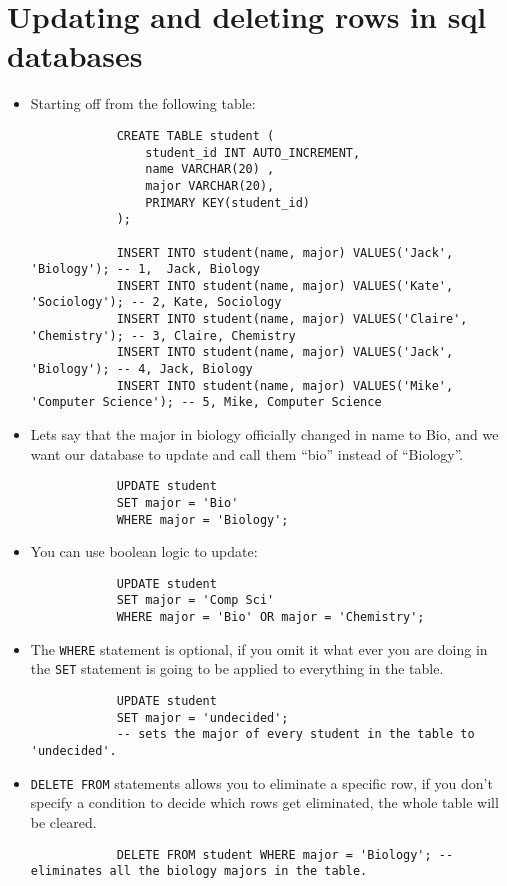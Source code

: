 \section{Updating and deleting rows in sql databases}
\begin{itemize}
    \item Starting off from the following table:
        \begin{verbatim}
            CREATE TABLE student (
                student_id INT AUTO_INCREMENT,
                name VARCHAR(20) ,
                major VARCHAR(20),
                PRIMARY KEY(student_id)
            );

            INSERT INTO student(name, major) VALUES('Jack', 'Biology'); -- 1,  Jack, Biology
            INSERT INTO student(name, major) VALUES('Kate', 'Sociology'); -- 2, Kate, Sociology
            INSERT INTO student(name, major) VALUES('Claire', 'Chemistry'); -- 3, Claire, Chemistry
            INSERT INTO student(name, major) VALUES('Jack', 'Biology'); -- 4, Jack, Biology
            INSERT INTO student(name, major) VALUES('Mike', 'Computer Science'); -- 5, Mike, Computer Science
        \end{verbatim}
    
    \item Lets say that the major in biology officially changed in name to Bio, and we want our database to update and call them ``bio'' instead of ``Biology''.
        \begin{verbatim}
            UPDATE student 
            SET major = 'Bio'
            WHERE major = 'Biology';
        \end{verbatim}
    
    \item You can use boolean logic to update:
        \begin{verbatim}
            UPDATE student 
            SET major = 'Comp Sci' 
            WHERE major = 'Bio' OR major = 'Chemistry';
        \end{verbatim}
    
    \item The \texttt{WHERE} statement is optional, if you omit it what ever you are doing in the \texttt{SET} statement is going to be applied to everything in the table.
        \begin{verbatim}
            UPDATE student 
            SET major = 'undecided';
            -- sets the major of every student in the table to 'undecided'.
        \end{verbatim}
    
    \item \texttt{DELETE FROM} statements allows you to eliminate a specific row, if you don't specify a condition to decide which rows get eliminated, the whole table will be cleared.
        \begin{verbatim}
            DELETE FROM student WHERE major = 'Biology'; -- eliminates all the biology majors in the table.
        \end{verbatim}
\end{itemize}
